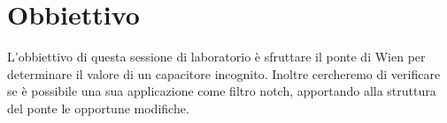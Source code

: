 \section*{Obbiettivo}

L'obbiettivo di questa sessione di laboratorio è sfruttare il ponte di Wien per determinare il valore di un capacitore incognito.
Inoltre cercheremo di verificare se è possibile una sua applicazione come filtro notch, apportando alla struttura del ponte le opportune modifiche.
